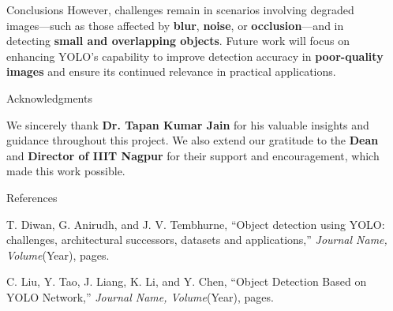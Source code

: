 \documentclass[final]{beamer}
\newlength{\sepwidth}
\newlength{\colwidth}
\newcommand{\separatorcolumn}{\begin{column}{\sepwidth}\end{column}}
\begin{document}
\begin{frame}[t]
\begin{columns}[t]
\begin{column}{\colwidth}
\begin{block}{Conclusions}
    However, challenges remain in scenarios involving degraded images—such as those affected by \textbf{blur}, \textbf{noise}, or \textbf{occlusion}—and in detecting \textbf{small and overlapping objects}. Future work will focus on enhancing YOLO’s capability to improve detection accuracy in \textbf{poor-quality images} and ensure its continued relevance in practical applications.
\end{block}

\begin{block}{Acknowledgments}
    \vspace{0.5cm} %
    
    We sincerely thank \textbf{Dr. Tapan Kumar Jain} for his valuable insights and guidance throughout this project. We also extend our gratitude to the \textbf{Dean} and \textbf{Director of IIIT Nagpur} for their support and encouragement, which made this work possible.
\end{block}

\begin{block}{References}
    \vspace{0.5cm} %
    \begin{thebibliography}{99} %
        T. Diwan, G. Anirudh, and J. V. Tembhurne, 
        ``Object detection using YOLO: challenges, architectural successors, datasets and applications,''
        \textit{Journal Name, Volume}(Year), pages. 

        C. Liu, Y. Tao, J. Liang, K. Li, and Y. Chen, 
        ``Object Detection Based on YOLO Network,''
        \textit{Journal Name, Volume}(Year), pages.
    \end{thebibliography}
\end{block}

  
\end{column}

\separatorcolumn
\end{columns}
\end{frame}
\end{document}
